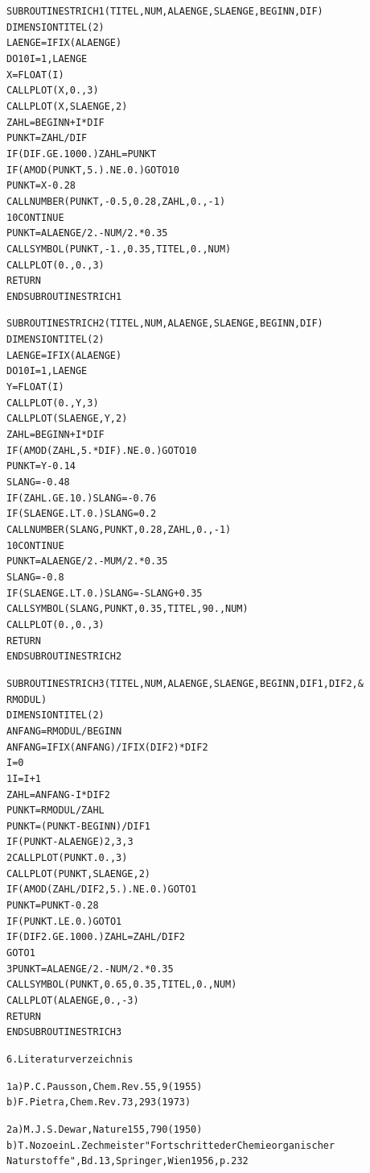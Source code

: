 \documentclass[a4paper,11pt]{article}
\begin{document}
\begin{alltt}
      SUBROUTINE STRICH1 (TITEL,NUM,ALAENGE,SLAENGE,BEGINN,DIF)
      DIMENSION TITEL(2)
      LAENGE = IFIX(ALAENGE)
      DO 10 I=1,LAENGE
      X = FLOAT(I)
      CALL PLOT (X,0.,3)
      CALL PLOT (X,SLAENGE,2)
      ZAHL = BEGINN + I*DIF
      PUNKT = ZAHL/DIF
      IF (DIF.GE.1000.) ZAHL = PUNKT
      IF (AMOD(PUNKT,5.).NE.0.) GO TO 10
      PUNKT = X - 0.28
      CALL NUMBER (PUNKT,-0.5,0.28,ZAHL,0.,-1)
   10 CONTINUE
      PUNKT = ALAENGE/2. - NUM/2.*0.35
      CALL SYMBOL (PUNKT,-1.,0.35,TITEL,0.,NUM)
      CALL PLOT (0.,0.,3)
      RETURN
      END SUBROUTINE STRICH1
\newpage
{}


      SUBROUTINE STRICH2 (TITEL,NUM,ALAENGE,SLAENGE,BEGINN,DIF)
      DIMENSION TITEL(2)
      LAENGE = IFIX(ALAENGE)
      DO 10 I=1,LAENGE
      Y = FLOAT(I)
      CALL PLOT (0.,Y,3)
      CALL PLOT (SLAENGE,Y,2)
      ZAHL = BEGINN + I*DIF
      IF (AMOD(ZAHL,5.*DIF).NE.0.) GO TO 10
      PUNKT = Y - 0.14
      SLANG = -0.48
      IF (ZAHL.GE.10.) SLANG = -0.76
      IF (SLAENGE.LT.0.) SLANG = 0.2
      CALL NUMBER (SLANG,PUNKT,0.28,ZAHL,0.,-1)
   10 CONTINUE
      PUNKT = ALAENGE/2. - MUM/2.*0.35
      SLANG = -0.8
      IF (SLAENGE.LT.0.) SLANG = -SLANG + 0.35
      CALL SYMBOL (SLANG,PUNKT,0.35,TITEL,90.,NUM)
      CALL PLOT (0.,0.,3)
      RETURN
      END SUBROUTINE STRICH2

      SUBROUTINE STRICH3 (TITEL,NUM,ALAENGE,SLAENGE,BEGINN,DIF1,DIF2,&
      RMODUL)
      DIMENSION TITEL(2)
      ANFANG = RMODUL/BEGINN
      ANFANG = IFIX(ANFANG)/IFIX(DIF2)*DIF2
      I = 0
    1 I = I +1
      ZAHL = ANFANG - I*DIF2
      PUNKT = RMODUL/ZAHL
      PUNKT = (PUNKT-BEGINN)/DIF1
      IF (PUNKT - ALAENGE) 2, 3, 3
    2 CALL PLOT (PUNKT.0.,3)
      CALL PLOT (PUNKT,SLAENGE,2)
      IF (AMOD(ZAHL/DIF2,5.).NE.0.) GO TO 1
      PUNKT = PUNKT - 0.28
      IF (PUNKT.LE.0.) GO TO 1
      IF (DIF2.GE.1000.) ZAHL = ZAHL/DIF2
      GO TO 1
    3 PUNKT = ALAENGE/2. - NUM/2.*0.35
      CALL SYMBOL (PUNKT,0.65,0.35,TITEL,0.,NUM)
      CALL PLOT (ALAENGE,0.,-3)
      RETURN
      END SUBROUTINE STRICH3
\newpage
{}


6. Literaturverzeichnis


1 a) P.C.Pausson, Chem.Rev. 55, 9 (1955)
  b) F.Pietra, Chem.Rev. 73, 293 (1973)

2 a) M.J.S.Dewar, Nature 155, 790 (1950)
  b) T.Nozoe in L.Zechmeister "Fortschritte der Chemie organischer
     Naturstoffe", Bd. 13, Springer, Wien 1956, p. 232


\end{alltt}
\end{document}
